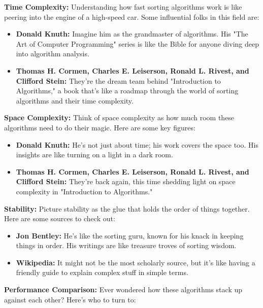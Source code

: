 \documentclass{article}
\begin{document}
\textbf{Time Complexity:} Understanding how fast sorting algorithms work is like peering into the engine of a high-speed car. Some influential folks in this field are:

\begin{itemize}
    \item \textbf{Donald Knuth:} Imagine him as the grandmaster of algorithms. His "The Art of Computer Programming" series is like the Bible for anyone diving deep into algorithm analysis.
  
    \item \textbf{Thomas H. Cormen, Charles E. Leiserson, Ronald L. Rivest, and Clifford Stein:} They're the dream team behind "Introduction to Algorithms," a book that's like a roadmap through the world of sorting algorithms and their time complexity.
\end{itemize}

\textbf{Space Complexity:} Think of space complexity as how much room these algorithms need to do their magic. Here are some key figures:

\begin{itemize}
    \item \textbf{Donald Knuth:} He's not just about time; his work covers the space too. His insights are like turning on a light in a dark room.
  
    \item \textbf{Thomas H. Cormen, Charles E. Leiserson, Ronald L. Rivest, and Clifford Stein:} They're back again, this time shedding light on space complexity in "Introduction to Algorithms."
\end{itemize}

\textbf{Stability:} Picture stability as the glue that holds the order of things together. Here are some sources to check out:

\begin{itemize}
    \item \textbf{Jon Bentley:} He's like the sorting guru, known for his knack in keeping things in order. His writings are like treasure troves of sorting wisdom.
  
    \item \textbf{Wikipedia:} It might not be the most scholarly source, but it's like having a friendly guide to explain complex stuff in simple terms.
\end{itemize}

\textbf{Performance Comparison:} Ever wondered how these algorithms stack up against each other? Here's who to turn to:
\end{document}
